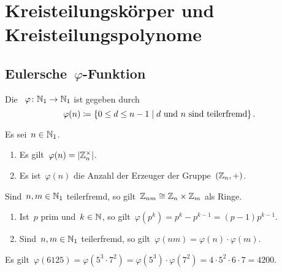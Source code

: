 \section{Kreisteilungskörper und Kreisteilungspolynome}



\subsection{Eulersche~\texorpdfstring{$\varphi$}{phi}-Funktion}

\begin{definition}
  Die ~$\varphi \colon \Natural_1 \to \Natural_1$ ist gegeben durch
  \[
    \varphi(n)
    \defined
    \{
      0 \leq d \leq n-1
    \suchthat
      \text{$d$ und~$n$ sind teilerfremd}
    \} \,.
  \]
\end{definition}

\begin{proposition}
  Es sei~$n \in \mathbb{N}_1$.
  \begin{enumerate}
    \item
      Es gilt~$\varphi(n) = \lvert \mathbb{Z}_n^\times \rvert$.
    \item
      Es ist~$\varphi(n)$ die Anzahl der Erzeuger der Gruppe~$(\mathbb{Z}_n, +)$.
  \end{enumerate}
\end{proposition}

\begin{lemma}
  Sind~$n, m \in \mathbb{N}_1$ teilerfremd, so gilt~$\mathbb{Z}_{nm} \cong \mathbb{Z}_n \times \mathbb{Z}_m$ als Ringe.
\end{lemma}

\begin{proposition}
  \leavevmode
  \begin{enumerate}
    \item
      Ist~$p$ prim und~$k \in \mathbb{N}$, so gilt~$\varphi(p^k) = p^k - p^{k-1} = (p-1) p^{k-1}$.
    \item
      Sind~$n, m \in \mathbb{N}_1$ teilerfremd, so gilt~$\varphi(nm) = \varphi(n) \cdot \varphi(m)$.
  \end{enumerate}
\end{proposition}

\begin{example}
  Es gilt~$\varphi(6125) = \varphi(5^3 \cdot 7^2) = \varphi(5^3) \cdot \varphi(7^2) = 4 \cdot 5^2 \cdot 6 \cdot 7 = 4200$.
\end{example}



